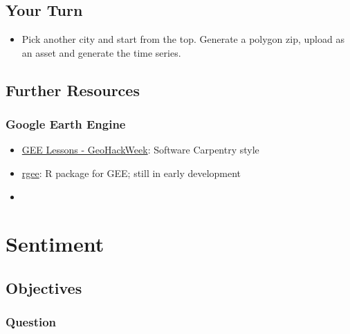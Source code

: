 \documentclass[]{book}
\providecommand{\tightlist}{%
  \setlength{\itemsep}{0pt}\setlength{\parskip}{0pt}}
\begin{document}
\hypertarget{your-turn}{%
\section{Your Turn}\label{your-turn}}

\begin{itemize}
\tightlist
\item
  Pick another city and start from the top. Generate a polygon zip, upload as an asset and generate the time series.
\end{itemize}

\hypertarget{further-resources}{%
\section*{Further Resources}\label{further-resources}}

\hypertarget{google-earth-engine}{%
\subsection*{Google Earth Engine}\label{google-earth-engine}}

\begin{itemize}
\tightlist
\item
  \href{https://geohackweek.github.io/GoogleEarthEngine/}{GEE Lessons - GeoHackWeek}: Software Carpentry style
\item
  \href{https://r-spatial.github.io/rgee/}{rgee}: R package for GEE; still in early development
\item
  \citep{gorelickGoogleEarthEngine2017a}
\end{itemize}

\hypertarget{sentiment}{%
\chapter{Sentiment}\label{sentiment}}

\hypertarget{objectives-1}{%
\section*{Objectives}\label{objectives-1}}

\hypertarget{question-1}{%
\subsection*{Question}\label{question-1}}
\end{document}
